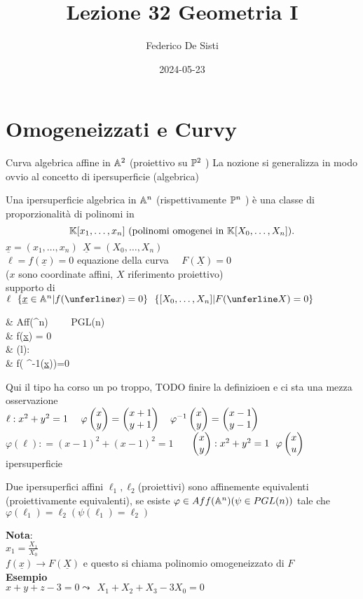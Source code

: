 \documentclass[12px]{article}
\title{Lezione 32 Geometria I}
\date{2024-05-23}
\author{Federico De Sisti}
\begin{document}
	\maketitle
	\newpage
	\section{Omogeneizzati e Curvy}
	Curva algebrica affine in $\mathbb{A}^2$ (proiettivo su $\mathbb{P}^2$ ) La nozione si generalizza in modo ovvio al concetto di ipersuperficie (algebrica)
	\begin{defi}
		Una ipersuperficie algebrica in $\mathbb{A}^n$ (rispettivamente $\mathbb{P}^n$ ) è una classe di proporzionalità di polinomi in
		\[
			\mathbb{K}[x_1,\ldots,x_n] \text{ (polinomi omogenei in } \mathbb{K}[X_0,\ldots,X_n])
		.\] 
		$\underline{x} = (x_1,\ldots,x_n) \ \ \underline X = (X_0,\ldots,X_n)$\\
		$\ell = f(\underline x) = 0$ equazione della curva \ \ $F(\underline X)=0$\\
		($x$ sono coordinate affini, $X$ riferimento proiettivo)\\
		supporto di $\ell\ \ \{\underline x\in\A^n|f(\unferline x)=0\}\ \ \{[X_0,\ldots,X_n]|F(\unferline X) =0 \}$ \\
		 \begin{aligend}
			& \varphi\in Aff(\A^n) \ \ \ \ \psi \in PGL(n)\\
			& \ell {} f(\underline x) = 0\\
			&  \varphi(l): \\
			& f( \varphi^{-1}(\underline x))=0
		\end{aligend}
	\end{defi}
	Qui il tipo ha corso un po troppo, TODO finire la definizioen e ci sta una mezza osservazione\\
	$\ell : x^2 + y^2 = 1 \ \ \ \ \varphi\matrice{x\\y} = \matrice{x+1\\y+1}\ \ \ \varphi^{-1}\matrice{x\\y}=\matrice{x-1\\y-1}$\\
	$ \varphi(\ell): = (x-1)^2+(x-1)^2 = 1$ \ \ \ $\matrice{x\\y}:x^2 + y^2=1 \ \ \varphi\matrice{x\\u} $ ipersuperficie
	\begin{defi}
		Due ipersuperfici affini $\ell_1,\ell_2$(proiettivi) sono affinemente equivalenti (proiettivamente equivalenti), se esiste $ \varphi\in Aff(\mathbb{A}^n) (\psi \in PGL(n))
		\\$ 
		tale che $ \varphi(\ell_1)=\ell_2 (\psi(\ell_1) = \ell_2)$
	\end{defi}
	\textbf{Nota}:\\
	$x_1 = \frac {X_1} {X_0}$\\
	$f(\underline x) \rightarrow F(\underline X)$ e questo si chiama polinomio omogeneizzato di $F$ \\
	\textbf{Esempio}\\
$x + y + z - 3 = 0 \leadsto \ \ X_1+X_2+X_3-3X_0=0$
\end{document}
